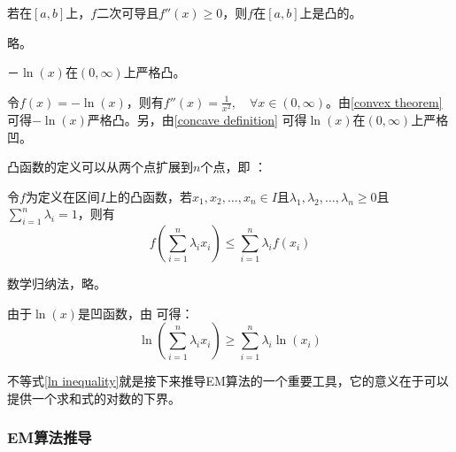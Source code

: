 \documentclass[11pt,a4paper]{article}
\numberwithin{equation}{section}
\renewenvironment{proof}{{\noindent \textbf{证明}}}{}
\begin{document}
\begin{theorem}\label{convex theorem}
若在$ [a, b] $上，$ f $二次可导且$ f''(x) \ge 0 $，则$ f $在$ [a, b] $上是凸的。
\end{theorem}

\begin{proof}
略。
\end{proof}

\begin{proposition}\label{ln proposition}
$ －\ln(x) $在$ (0, \infty) $上严格凸。
\end{proposition}

\begin{proof}
令$ f(x) = -\ln(x) $，则有$ f''(x) = \frac{1}{x^2}, \quad \forall x \in (0, \infty) $。由\autoref{convex theorem} 可得$ -\ln(x) $严格凸。另，由\autoref{concave definition} 可得$ \ln(x) $在$ (0, \infty) $上严格凹。
\end{proof}

凸函数的定义可以从两个点扩展到$ n $个点，即  ：

\begin{theorem}[Jensen不等式]\label{n points convex}
令$ f $为定义在区间$ I $上的凸函数，若$ x_1, x_2, \ldots, x_n \in I $且$ \lambda_1, \lambda_2, \ldots, \lambda_n \ge 0 $且$ \sum_{i = 1}^n \lambda_i = 1 $，则有
\begin{equation*}
f(\sum_{i = 1}^n \lambda_i x_i) \le \sum_{i = 1}^n \lambda_i f(x_i)
\end{equation*}
\end{theorem}

\begin{proof}
数学归纳法，略。
\end{proof}

由于$ \ln(x) $是凹函数，由 可得：
\begin{equation}\label{ln inequality}
\ln(\sum_{i = 1}^n \lambda_i x_i) \ge \sum_{i = 1}^n \lambda_i \ln(x_i)
\end{equation}

不等式\eqref{ln inequality}就是接下来推导EM算法的一个重要工具，它的意义在于可以提供一个求和式的对数的下界。

\subsubsection{EM算法推导}
\end{document}
